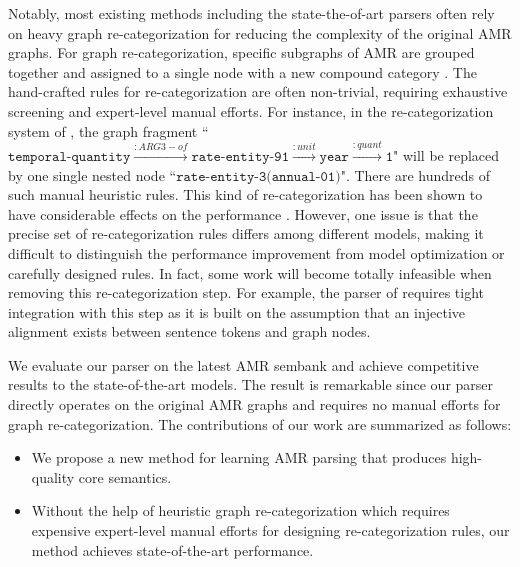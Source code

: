 \documentclass[11pt,a4paper]{article}
\begin{document}
	Notably, most existing methods including the state-the-of-art parsers often rely on heavy graph re-categorization for reducing the complexity of the original AMR graphs. For graph re-categorization, specific subgraphs of AMR are grouped together and assigned to a single node with a new compound category \cite{werling2015robust,wang2017getting,foland2017abstract,lyu2018amr,groschwitz2018amr,guo2018better}. The hand-crafted rules for re-categorization are often non-trivial, requiring exhaustive screening and expert-level manual efforts. For instance, in the re-categorization system of , the graph fragment ``$\texttt{temporal-quantity}\stackrel{:ARG3-of}{\longrightarrow}\texttt{rate-entity-91}\stackrel{:unit}{\longrightarrow}\texttt{year}\stackrel{:quant}{\longrightarrow}\texttt{1}$" will be replaced by one single nested node ``$\texttt{rate-entity-3(annual-01)}$". There are hundreds of such manual heuristic rules. This kind of re-categorization has been shown to have considerable effects on the performance \cite{wang2017getting,guo2018better}. However, one issue is that the precise set of re-categorization rules differs among different models, making it difficult to distinguish the performance improvement from model optimization or carefully designed rules. In fact, some work will become totally infeasible when removing this re-categorization step. For example, the parser of  requires tight integration with this step as it is built on the assumption that an injective alignment exists between sentence tokens and graph nodes.
	
	We evaluate our parser on the latest AMR sembank and achieve competitive results to the state-of-the-art models. The result is remarkable since our parser directly operates on the original AMR graphs and requires no manual efforts for graph re-categorization. The contributions of our work are summarized as follows:
	\begin{itemize}
		\item We propose a new method for learning AMR parsing that produces high-quality core semantics.
		\item Without the help of heuristic graph re-categorization which requires expensive expert-level manual efforts for designing re-categorization rules, our method achieves state-of-the-art performance.
	\end{itemize}
\end{document}
